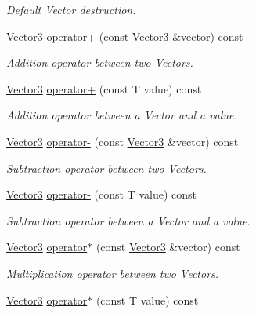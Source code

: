 \begin{DoxyCompactItemize}
\begin{DoxyCompactList}\small\item\em Default Vector destruction. \end{DoxyCompactList}\item 
\hyperlink{classsparky_1_1_vector3}{Vector3} \hyperlink{classsparky_1_1_vector3_a2bb994b9629587bf4921d63f22de90a5}{operator+} (const \hyperlink{classsparky_1_1_vector3}{Vector3} \&vector) const 
\begin{DoxyCompactList}\small\item\em Addition operator between two Vectors. \end{DoxyCompactList}\item 
\hyperlink{classsparky_1_1_vector3}{Vector3} \hyperlink{classsparky_1_1_vector3_a9ae98fd2b3e8263c9f8b5e5265593c28}{operator+} (const T value) const 
\begin{DoxyCompactList}\small\item\em Addition operator between a Vector and a value. \end{DoxyCompactList}\item 
\hyperlink{classsparky_1_1_vector3}{Vector3} \hyperlink{classsparky_1_1_vector3_addff8629310065be82edd49439c95d9d}{operator-\/} (const \hyperlink{classsparky_1_1_vector3}{Vector3} \&vector) const 
\begin{DoxyCompactList}\small\item\em Subtraction operator between two Vectors. \end{DoxyCompactList}\item 
\hyperlink{classsparky_1_1_vector3}{Vector3} \hyperlink{classsparky_1_1_vector3_af234c8bbf8442b5a6900065a8936a060}{operator-\/} (const T value) const 
\begin{DoxyCompactList}\small\item\em Subtraction operator between a Vector and a value. \end{DoxyCompactList}\item 
\hyperlink{classsparky_1_1_vector3}{Vector3} \hyperlink{classsparky_1_1_vector3_ab7cc63a9177d405ac2821b9826761cd8}{operator$\ast$} (const \hyperlink{classsparky_1_1_vector3}{Vector3} \&vector) const 
\begin{DoxyCompactList}\small\item\em Multiplication operator between two Vectors. \end{DoxyCompactList}\item 
\hyperlink{classsparky_1_1_vector3}{Vector3} \hyperlink{classsparky_1_1_vector3_acb1c664919aec1f6fec2882b769dd294}{operator$\ast$} (const T value) const 

\end{DoxyCompactItemize}
